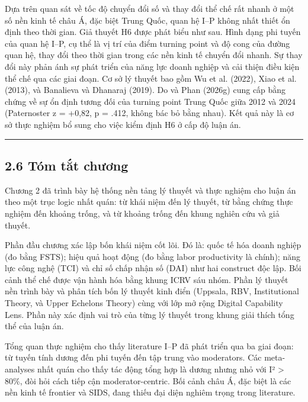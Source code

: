 \documentclass[12pt,a4paper]{article}
\begin{document}
Dựa trên quan sát về tốc độ chuyển đổi số và thay đổi thể chế rất nhanh
ở một số nền kinh tế châu Á, đặc biệt Trung Quốc, quan hệ I--P không
nhất thiết ổn định theo thời gian. Giả thuyết H6 được phát biểu như sau.
Hình dạng phi tuyến của quan hệ I--P, cụ thể là vị trí của điểm turning
point và độ cong của đường quan hệ, thay đổi theo thời gian trong các
nền kinh tế chuyển đổi nhanh. Sự thay đổi này phản ánh sự phát triển của
năng lực doanh nghiệp và cải thiện điều kiện thể chế qua các giai đoạn.
Cơ sở lý thuyết bao gồm Wu et al. (2022), Xiao et al. (2013), và
Banalieva và Dhanaraj (2019). Do và Phan (2026g) cung cấp bằng chứng về
sự ổn định tương đối của turning point Trung Quốc giữa 2012 và 2024
(Paternoster z = +0,82, p = .412, không bác bỏ bằng nhau). Kết quả này
là cơ sở thực nghiệm bổ sung cho việc kiểm định H6 ở cấp độ luận án.

\begin{center}\rule{0.5\linewidth}{0.5pt}\end{center}

\hypertarget{26-tuxf3m-tux1eaft-chux1b0ux1a1ng}{%
\subsection{2.6 Tóm tắt
chương}\label{26-tuxf3m-tux1eaft-chux1b0ux1a1ng}}

Chương 2 đã trình bày hệ thống nền tảng lý thuyết và thực nghiệm cho
luận án theo một trục logic nhất quán: từ khái niệm đến lý thuyết, từ
bằng chứng thực nghiệm đến khoảng trống, và từ khoảng trống đến khung
nghiên cứu và giả thuyết.

Phần đầu chương xác lập bốn khái niệm cốt lõi. Đó là: quốc tế hóa doanh
nghiệp (đo bằng FSTS); hiệu quả hoạt động (đo bằng labor productivity là
chính); năng lực công nghệ (TCI) và chỉ số chấp nhận số (DAI) như hai
construct độc lập. Bối cảnh thể chế được vận hành hóa bằng khung ICRV
sáu nhóm. Phần lý thuyết nền trình bày và phân tích bốn lý thuyết kinh
điển (Uppsala, RBV, Institutional Theory, và Upper Echelons Theory) cùng
với lớp mở rộng Digital Capability Lens. Phần này xác định vai trò của
từng lý thuyết trong khung giải thích tổng thể của luận án.

Tổng quan thực nghiệm cho thấy literature I--P đã phát triển qua ba giai
đoạn: từ tuyến tính dương đến phi tuyến đến tập trung vào moderators.
Các meta-analyses nhất quán cho thấy tác động tổng hợp là dương nhưng
nhỏ với I² \textgreater{} 80\%, đòi hỏi cách tiếp cận moderator-centric.
Bối cảnh châu Á, đặc biệt là các nền kinh tế frontier và SIDS, đang
thiếu đại diện nghiêm trọng trong literature.
\end{document}
